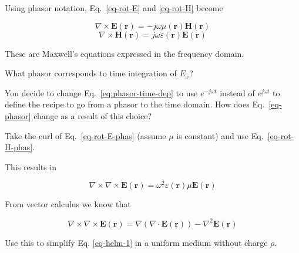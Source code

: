 Using phasor notation, Eq.~\ref{eq-rot-E} and \ref{eq-rot-H} become

\begin{equation}
\nabla \times {\mathbf E}({\mathbf r}) = - j \omega \mu({\mathbf r}) {\mathbf H}({\mathbf r})
\label{eq-rot-E-phas}
\end{equation}
\begin{equation}   
\nabla \times {\mathbf H}({\mathbf r}) = j \omega \varepsilon({\mathbf r}) {\mathbf E}({\mathbf r}) \label{eq-rot-H-phas}
\end{equation}

These are Maxwell's equations expressed in the frequency domain.


\begin{exer}
  What phasor corresponds to time integration of $E_x$?
\end{exer}

\begin{exer}
You decide to change Eq.~\ref{eq:phasor-time-dep} to use $e^{-j \omega t}$ instead of $e^{j \omega t}$ to define the recipe to go from a phasor to the time domain. How does Eq.~\ref{eq-phasor} change as a result of this choice? 
\end{exer}

\pagebreak


\begin{cue}
Take the curl of Eq.~\ref{eq-rot-E-phas} (assume $\mu$ is constant) and use Eq.~\ref{eq-rot-H-phas}.
\end{cue}

This results in

\begin{equation}
  \nabla \times \nabla \times {\mathbf E}({\mathbf r}) = \omega^2 \varepsilon({\mathbf r}) \mu {\mathbf E}({\mathbf r})
  \label{eq-helm-1}
\end{equation}

From vector calculus we know that

\begin{equation}
\nabla \times \nabla \times {\mathbf E}({\mathbf r}) = \nabla (\nabla \cdot {\mathbf E}({\mathbf r})) - \nabla^2 {\mathbf E}({\mathbf r})
\end{equation}

\begin{cue}
Use this to simplify Eq. \ref{eq-helm-1} in a uniform medium without charge $\rho$. 
\end{cue}

